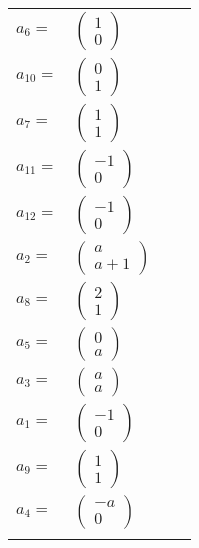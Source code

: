 \documentclass[1p]{elsarticle_modified}
\theoremstyle{definition}
\begin{document}
\begin{tabular}{m{7pt} m{180pt} m{7pt} m{180pt} }
\flushright $a_{6}=$&$\begin{pmatrix}1\\0\end{pmatrix}$ \\
\flushright $a_{10}=$&$\begin{pmatrix}0\\1\end{pmatrix}$ \\
\flushright $a_{7}=$&$\begin{pmatrix}1\\1\end{pmatrix}$ \\
\flushright $a_{11}=$&$\begin{pmatrix}-1\\0\end{pmatrix}$ \\
\flushright $a_{12}=$&$\begin{pmatrix}-1\\0\end{pmatrix}$ \\
\flushright $a_{2}=$&$\begin{pmatrix}a\\a+1\end{pmatrix}$ \\
\flushright $a_{8}=$&$\begin{pmatrix}2\\1\end{pmatrix}$ \\
\flushright $a_{5}=$&$\begin{pmatrix}0\\a\end{pmatrix}$ \\
\flushright $a_{3}=$&$\begin{pmatrix}a\\a\end{pmatrix}$ \\
\flushright $a_{1}=$&$\begin{pmatrix}-1\\0\end{pmatrix}$ \\
\flushright $a_{9}=$&$\begin{pmatrix}1\\1\end{pmatrix}$ \\
\flushright $a_{4}=$&$\begin{pmatrix}- a\\0\end{pmatrix}$\\&\end{tabular}
\end{document}
